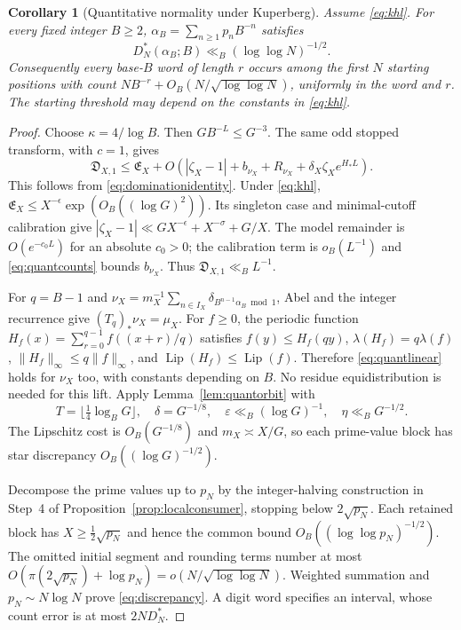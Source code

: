 \documentclass[11pt,a4paper]{article}
\newtheorem{corollary}[theorem]{Corollary}
\begin{document}
\begin{corollary}[Quantitative normality under Kuperberg]\label{cor:quantitative}
Assume \eqref{eq:khl}. For every fixed integer $B\ge2$,
$\alpha_B=\sum_{n\ge1}p_nB^{-n}$ satisfies
\begin{equation}\label{eq:discrepancy}
 D_N^*(\alpha_B;B)\ll_B(\log\log N)^{-1/2}.
\end{equation}
Consequently every base-$B$ word of length $r$ occurs among the first
$N$ starting positions with count
$NB^{-r}+O_B(N/\sqrt{\log\log N})$, uniformly in the word and $r$.
The starting threshold may depend on the constants in \eqref{eq:khl}.
\end{corollary}
\begin{proof}
Choose $\kappa=4/\log B$. Then $GB^{-L}\le G^{-3}$.
The same odd stopped transform, with $c=1$, gives
\[
 \mathfrak D_{X,1}\le\mathfrak E_X+
 O\!\left(|\zeta_X-1|+b_{\nu_X}+R_{\nu_X}
                       +\delta_X\zeta_X e^{H_*L}\right).
\]
This follows from \eqref{eq:dominationidentity}.
Under \eqref{eq:khl},
$\mathfrak E_X\le X^{-\epsilon}\exp(O_B((\log G)^2))$.
Its singleton case and minimal-cutoff calibration give
$|\zeta_X-1|\ll GX^{-\epsilon}+X^{-\sigma}+G/X$.
The model remainder is $O(e^{-c_0L})$ for an absolute $c_0>0$;
the calibration term is $o_B(L^{-1})$ and \eqref{eq:quantcounts}
bounds $b_{\nu_X}$. Thus $\mathfrak D_{X,1}\ll_B L^{-1}$.

For $q=B-1$ and
$\nu_X=m_X^{-1}\sum_{n\in I_X}\delta_{B^{n-1}\alpha_B\bmod1}$,
Abel and the integer recurrence give $(T_q)_*\nu_X=\mu_X$.
For $f\ge0$, the periodic function
$H_f(x)=\sum_{r=0}^{q-1}f((x+r)/q)$ satisfies
$f(y)\le H_f(qy)$, $\lambda(H_f)=q\lambda(f)$,
$\|H_f\|_\infty\le q\|f\|_\infty$, and
$\operatorname{Lip}(H_f)\le\operatorname{Lip}(f)$.
Therefore \eqref{eq:quantlinear} holds for $\nu_X$ too, with constants
depending on $B$. No residue equidistribution is needed for this lift.
Apply Lemma~\ref{lem:quantorbit} with
\[
 T=\lfloor\tfrac14\log_B G\rfloor,\quad\delta=G^{-1/8},\quad
 \varepsilon\ll_B(\log G)^{-1},\quad\eta\ll_B G^{-1/2}.
\]
The Lipschitz cost is $O_B(G^{-1/8})$ and $m_X\asymp X/G$, so each
prime-value block has star discrepancy $O_B((\log G)^{-1/2})$.

Decompose the prime values up to $p_N$ by the integer-halving construction
in Step~4 of Proposition~\ref{prop:localconsumer}, stopping below
$2\sqrt{p_N}$. Each retained block has $X\ge\frac12\sqrt{p_N}$ and hence
the common bound $O_B((\log\log p_N)^{-1/2})$.
The omitted initial segment and rounding terms number at most
$O(\pi(2\sqrt{p_N})+\log p_N)=o(N/\sqrt{\log\log N})$.
Weighted summation and $p_N\sim N\log N$ prove \eqref{eq:discrepancy}.
A digit word specifies an interval, whose count error is at most $2ND_N^*$.
\end{proof}
\end{document}
